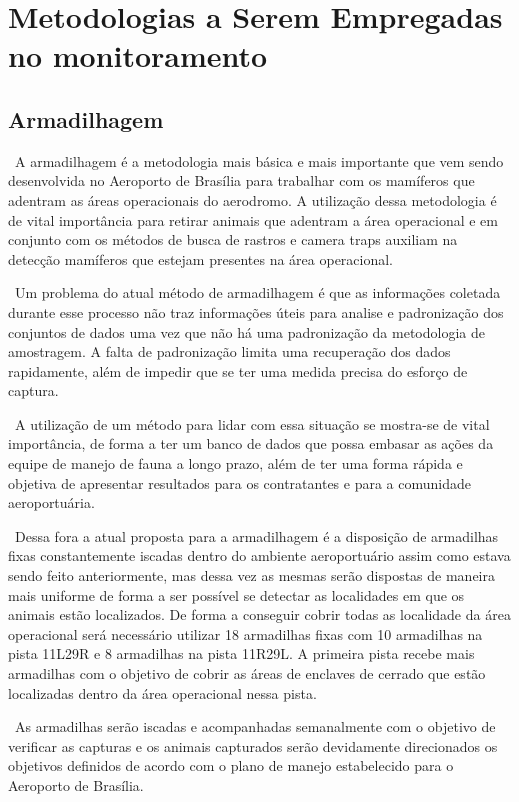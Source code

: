 \documentclass[a4paper,16,onecolumn]{article}
\begin{document}
\begin{itemize}
\begin{itemize}
\end{itemize}

\section{Metodologias a Serem Empregadas no monitoramento}

\subsection{Armadilhagem}

\ A armadilhagem é a metodologia mais básica e mais importante que vem sendo desenvolvida no Aeroporto de Brasília para trabalhar com os mamíferos que adentram as áreas operacionais do aerodromo. A utilização dessa metodologia é de vital importância para retirar animais que adentram a área operacional e em conjunto com os métodos de busca de rastros e camera traps auxiliam na detecção mamíferos que estejam presentes na área operacional.

\ Um problema do atual método de armadilhagem é que as informações coletada durante esse processo não traz informações úteis para analise e padronização dos conjuntos de dados uma vez que não há uma padronização da metodologia de amostragem. A falta de padronização limita uma recuperação dos dados rapidamente, além de impedir que se ter uma medida precisa do esforço de captura.

\ A utilização de um método para lidar com essa situação se mostra-se de vital importância, de forma a ter um banco de dados que possa embasar as ações da equipe de manejo de fauna a longo prazo, além de ter uma forma rápida e objetiva de apresentar resultados para os contratantes e para a comunidade aeroportuária.

\ Dessa fora a atual proposta para a armadilhagem é a disposição de armadilhas fixas constantemente iscadas dentro do ambiente aeroportuário assim como estava sendo feito anteriormente, mas dessa vez as mesmas serão dispostas de maneira mais uniforme de forma a ser possível se detectar as localidades em que os animais estão localizados. De forma a conseguir cobrir todas as localidade da área operacional será necessário utilizar 18 armadilhas fixas com 10 armadilhas na pista 11L29R e 8 armadilhas na pista 11R29L. A primeira pista recebe mais armadilhas com o objetivo de cobrir as áreas de enclaves de cerrado que estão localizadas dentro da área operacional nessa pista.

\ As armadilhas serão iscadas e acompanhadas semanalmente com o objetivo de verificar as capturas e os animais capturados serão devidamente direcionados os objetivos definidos de acordo com o plano de manejo estabelecido para o Aeroporto de Brasília.


\end{itemize}
\end{document}
